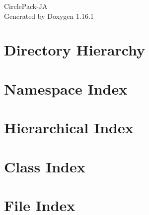 \documentclass[twoside]{book}
\newcommand{\+}{\discretionary{\mbox{\scriptsize$\hookleftarrow$}}{}{}}
\newcommand{\clearemptydoublepage}{%
    \newpage{\pagestyle{empty}\cleardoublepage}%
  }
\begin{document}
  \raggedbottom
    \hypersetup{pageanchor=false,
                bookmarksnumbered=true,
                pdfencoding=unicode
               }
  \begin{titlepage}
  \vspace*{7cm}
  \begin{center}%
  {\Large Circle\+Pack-\/\+JA}\\
  \vspace*{1cm}
  {\large Generated by Doxygen 1.16.1}\\
  \end{center}
  \end{titlepage}
  \clearemptydoublepage
  \tableofcontents
  \clearemptydoublepage
  \hypersetup{pageanchor=true}

\chapter{Directory Hierarchy}

\chapter{Namespace Index}

\chapter{Hierarchical Index}

\chapter{Class Index}

\chapter{File Index}

\end{document}
